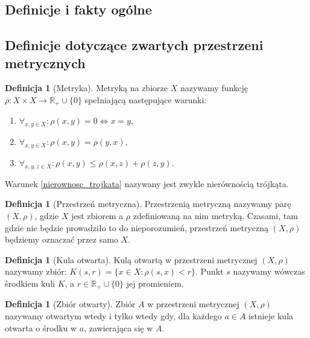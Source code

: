\documentclass[licencjacka]{pwr_wmat_praca_dyplomowa}
\theoremstyle{plain}
\numberwithin{theorem}{chapter}
\theoremstyle{definition}
\numberwithin{theorem}{chapter}
\newtheorem{definition}[theorem]{Definicja}
\begin{document}


\subsection{Definicje i fakty ogólne}






\subsection{Definicje dotyczące zwartych przestrzeni metrycznych}

\begin{definition}[Metryka]
Metryką na zbiorze $X$ nazywamy funkcję $\rho : X \times X \longrightarrow \mathbb{R}_+ \cup \{0\}$ spełniającą następujące warunki:
\begin{enumerate}
\item $\forall_{x,y \in X}: \rho(x,y)=0 \iff x=y$,
\item $\forall_{x,y \in X}: \rho(x,y) = \rho(y,x)$,
\item \label{nierownosc_trojkata} $\forall_{x,y,z \in X}: \rho(x,y) \leq \rho(x,z) + \rho(z,y)$.
\end{enumerate}
Warunek \ref{nierownosc_trojkata} nazywany jest zwykle nierównością trójkąta.

\end{definition}

\begin{definition}[Przestrzeń metryczna]
Przestrzenią metryczną nazywamy parę $(X, \rho)$, gdzie $X$ jest zbiorem a $\rho$ zdefiniowaną na nim metryką. Czasami, tam gdzie nie będzie prowadziło to do nieporozumień, przestrzeń metryczną $(X, \rho)$ będziemy oznaczać przez samo $X$.
\end{definition}

\begin{definition}[Kula otwarta]
Kulą otwartą w przestrzeni metrycznej $(X, \rho)$ nazywamy zbiór: $K(s, r) = \{x \in X: \rho(s, x) < r\}$.
Punkt $s$ nazywamy wówczas środkiem kuli $K$, a $r \in \mathbb{R}_+ \cup \{0\}$ jej promieniem.
\end{definition}

\begin{definition}[Zbiór otwarty]
Zbiór $A$ w przestrzeni metrycznej $(X, \rho)$ nazywamy otwartym wtedy i tylko wtedy gdy, dla każdego $a \in A$ istnieje kula otwarta o środku w $a$, zawierająca się w $A$.
\end{definition}
\end{document}
